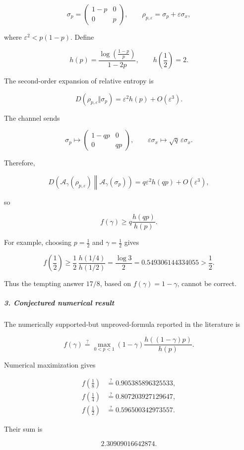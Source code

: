 \documentclass[11pt]{article}
\begin{document}
\[
\sigma_p=
\begin{pmatrix}
1-p&0\\
0&p
\end{pmatrix},
\qquad
\rho_{p,\varepsilon}
=
\sigma_p+\varepsilon\sigma_x,
\]

where $\varepsilon^2<p(1-p)$. Define

\[
h(p)= \frac{\log\!\left(\frac{1-p}{p}\right)}{1-2p}, \qquad h\left(\frac12\right)=2.
\]

The second-order expansion of relative entropy is

\[
D(\rho_{p,\varepsilon}\Vert\sigma_p) = \varepsilon^2h(p)+O(\varepsilon^3).
\]

The channel sends

\[
\sigma_p\longmapsto
\begin{pmatrix}
1-qp&0\\
0&qp
\end{pmatrix},
\qquad
\varepsilon\sigma_x\longmapsto
\sqrt q\,\varepsilon\sigma_x.
\]

Therefore,

\[
D\!\left( \mathcal A_\gamma(\rho_{p,\varepsilon}) \middle\| \mathcal A_\gamma(\sigma_p) \right) = q\varepsilon^2h(qp)+O(\varepsilon^3),
\]

so

\[
f(\gamma)\geq q\frac{h(qp)}{h(p)}.
\]

For example, choosing $p=\tfrac12$ and $\gamma=\tfrac12$ gives

\[
f\left(\frac12\right) \geq \frac12\,\frac{h(1/4)}{h(1/2)} = \frac{\log3}{2} = 0.549306144334055 > \frac12.
\]

Thus the tempting answer $17/8$, based on $f(\gamma)=1-\gamma$, cannot be correct.

\subparagraph*{3. Conjectured numerical result}

The numerically supported-but unproved-formula reported in the literature is

\[
f(\gamma)\stackrel{?}{=} \max_{0<p<1} (1-\gamma) \frac{h((1-\gamma)p)}{h(p)}.
\]

Numerical maximization gives

\[
\begin{aligned}
f\left(\frac18\right)&\stackrel{?}{=}0.905385896325533,\\
f\left(\frac14\right)&\stackrel{?}{=}0.807203927129647,\\
f\left(\frac12\right)&\stackrel{?}{=}0.596500342973557.
\end{aligned}
\]

Their sum is

\[
2.30909016642874.
\]
\end{document}
